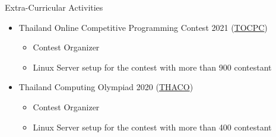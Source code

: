 \documentclass{resume} %
\begin{document}
\begin{rSection}{Extra-Curricular Activities}
    \begin{itemize}
        \item 	Thailand Online Competitive Programming Contest 2021 (\href{https://tocpc.codes}{TOCPC})
              \begin{itemize}
                  \item Contest Organizer
                  \item Linux Server setup for the contest with more than 900 contestant
              \end{itemize}
        \item 	Thailand Computing Olympiad 2020 (\href{https://thaco.tech}{THACO})
              \begin{itemize}
                  \item Contest Organizer
                  \item Linux Server setup for the contest with more than 400 contestant
              \end{itemize}
    \end{itemize}
\end{rSection}
\end{document}
